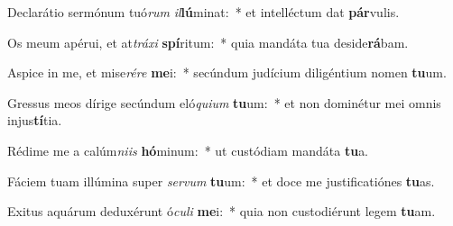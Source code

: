\item Declarátio sermónum tuó\textit{rum} \textit{il}\textbf{lú}minat:~* et intelléctum dat \textbf{pár}vulis.
\item Os meum apérui, et at\textit{trá}\textit{xi} \textbf{spí}ritum:~* quia mandáta tua deside\textbf{rá}bam.
\item Aspice in me, et mise\textit{ré}\textit{re} \textbf{me}i:~* secúndum judícium diligéntium nomen \textbf{tu}um.
\item Gressus meos dírige secúndum eló\textit{qui}\textit{um} \textbf{tu}um:~* et non dominétur mei omnis injus\textbf{tí}tia.
\item Rédime me a calúm\textit{ni}\textit{is} \textbf{hó}minum:~* ut custódiam mandáta \textbf{tu}a.
\item Fáciem tuam illúmina super \textit{ser}\textit{vum} \textbf{tu}um:~* et doce me justificatiónes \textbf{tu}as.
\item Exitus aquárum deduxérunt ó\textit{cu}\textit{li} \textbf{me}i:~* quia non custodiérunt legem \textbf{tu}am.
